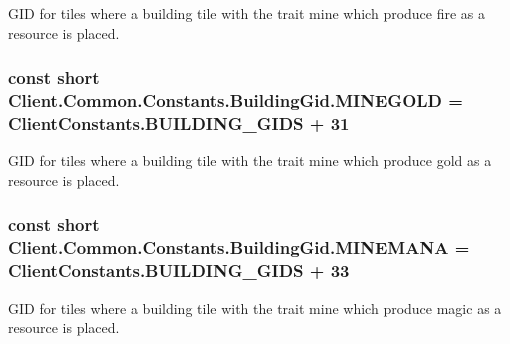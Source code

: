 G\+I\+D for tiles where a building tile with the trait mine which produce fire as a resource is placed. 

\hypertarget{classClient_1_1Common_1_1Constants_1_1BuildingGid_a11c21e46efe88c20b1d2ab8977ebe1a3}{}
\subsubsection[{M\+I\+N\+E\+G\+O\+L\+D}]{\setlength{\rightskip}{0pt plus 5cm}const short Client.\+Common.\+Constants.\+Building\+Gid.\+M\+I\+N\+E\+G\+O\+L\+D = {\bf Client\+Constants.\+B\+U\+I\+L\+D\+I\+N\+G\+\_\+\+G\+I\+D\+S} + 31}\label{classClient_1_1Common_1_1Constants_1_1BuildingGid_a11c21e46efe88c20b1d2ab8977ebe1a3}


G\+I\+D for tiles where a building tile with the trait mine which produce gold as a resource is placed. 

\hypertarget{classClient_1_1Common_1_1Constants_1_1BuildingGid_a8c2061e84d00c88b991168f0375c3024}{}
\subsubsection[{M\+I\+N\+E\+M\+A\+N\+A}]{\setlength{\rightskip}{0pt plus 5cm}const short Client.\+Common.\+Constants.\+Building\+Gid.\+M\+I\+N\+E\+M\+A\+N\+A = {\bf Client\+Constants.\+B\+U\+I\+L\+D\+I\+N\+G\+\_\+\+G\+I\+D\+S} + 33}\label{classClient_1_1Common_1_1Constants_1_1BuildingGid_a8c2061e84d00c88b991168f0375c3024}


G\+I\+D for tiles where a building tile with the trait mine which produce magic as a resource is placed. 

\hypertarget{classClient_1_1Common_1_1Constants_1_1BuildingGid_a6a3a47119f9286cc5ebe703bcf3113ee}{}
